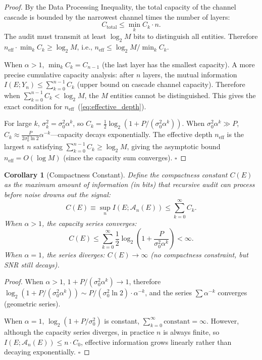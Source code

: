 \documentclass[12pt,a4paper]{article}
\newtheorem{corollary}[theorem]{Corollary}
\theoremstyle{definition}
\newcommand{\AuditOp}{\mathcal{A}}
\begin{document}
\begin{proof}
By the Data Processing Inequality, the total capacity of the channel cascade is bounded by the narrowest channel times the number of layers:
\begin{equation*}
    C_{\text{total}} \leq \min_{k} C_k \cdot n.
\end{equation*}
The audit must transmit at least $\log_2 M$ bits to distinguish all entities. Therefore $n_{\text{eff}} \cdot \min_k C_k \geq \log_2 M$, i.e., $n_{\text{eff}} \leq \log_2 M / \min_k C_k$.

When $\alpha > 1$, $\min_k C_k = C_{n-1}$ (the last layer has the smallest capacity). A more precise cumulative capacity analysis: after $n$ layers, the mutual information $I(E; Y_n) \leq \sum_{k=0}^{n-1} C_k$ (upper bound on cascade channel capacity). Therefore when $\sum_{k=0}^{n-1} C_k < \log_2 M$, the $M$ entities cannot be distinguished. This gives the exact condition for $n_{\text{eff}}$~(\ref{eq:effective_depth}).

For large $k$, $\sigma_k^2 = \sigma_0^2 \alpha^k$, so $C_k = \frac{1}{2}\log_2(1 + P/(\sigma_0^2 \alpha^k))$. When $\sigma_0^2 \alpha^k \gg P$, $C_k \approx \frac{P}{2\sigma_0^2 \ln 2} \alpha^{-k}$---capacity decays exponentially. The effective depth $n_{\text{eff}}$ is the largest $n$ satisfying $\sum_{k=0}^{n-1} C_k \geq \log_2 M$, giving the asymptotic bound $n_{\text{eff}} = O(\log M)$ (since the capacity sum converges). \hfill$\square$
\end{proof}

\begin{corollary}[Compactness Constant]\label{cor:compactness_constant}
Define the compactness constant $C(E)$ as the maximum amount of information (in bits) that recursive audit can process before noise drowns out the signal:
\begin{equation}\label{eq:compactness_constant}
    C(E) \equiv \sup_{n} I(E; \AuditOp_n(E)) \leq \sum_{k=0}^{\infty} C_k.
\end{equation}
When $\alpha > 1$, the capacity series converges:
\begin{equation}\label{eq:capacity_sum}
    C(E) \leq \sum_{k=0}^{\infty} \frac{1}{2}\log_2\left(1 + \frac{P}{\sigma_0^2 \alpha^k}\right) < \infty.
\end{equation}
When $\alpha = 1$, the series diverges: $C(E) \to \infty$ (no compactness constraint, but SNR still decays).
\end{corollary}

\begin{proof}
When $\alpha > 1$, $1 + P/(\sigma_0^2 \alpha^k) \to 1$, therefore $\log_2(1 + P/(\sigma_0^2 \alpha^k)) \sim P/(\sigma_0^2 \ln 2) \cdot \alpha^{-k}$, and the series $\sum \alpha^{-k}$ converges (geometric series).

When $\alpha = 1$, $\log_2(1 + P/\sigma_0^2)$ is constant, $\sum_{k=0}^{\infty} \text{constant} = \infty$. However, although the capacity series diverges, in practice $n$ is always finite, so $I(E; \AuditOp_n(E)) \leq n \cdot C_0$, effective information grows linearly rather than decaying exponentially. \hfill$\square$
\end{proof}
\end{document}

